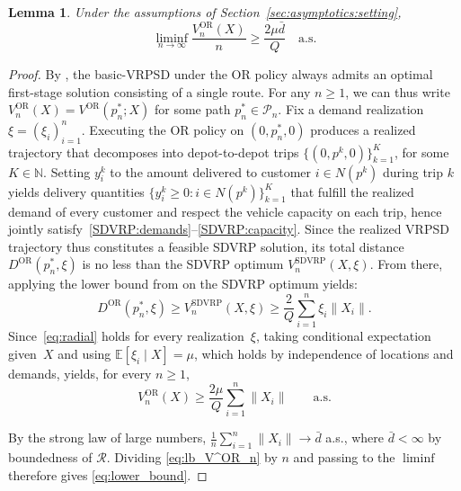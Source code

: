 \documentclass{article}
\newtheorem{lemma}{Lemma}
\begin{document}
{\begin{lemma}\label{lem:asymptotic_lb}
Under the assumptions of Section~\ref{sec:asymptotics:setting},
\begin{equation}\label{eq:lower_bound}
    \liminf_{n \to \infty} \frac{V^{\text{OR}}_n(X)}{n} \geq \frac{2\mu\bar d}{Q} \quad \text{a.s.}
\end{equation}
\end{lemma}
\begin{proof}
By \cite[Theorem~2]{yang2000stochastic}, the basic-VRPSD under the OR policy always admits an optimal first-stage solution consisting of a single route. For any $n\geq 1$, we can thus write $V^{\text{OR}}_n(X) = V^{\text{OR}}(p^*_n; X)$ for some path $p^*_n \in \mathcal{P}_n$. Fix a demand realization $\xi = (\xi_i)_{i=1}^n$. Executing the OR policy on $(0, p^*_n, 0)$ produces a realized trajectory that decomposes into depot-to-depot trips $\{(0, p^k, 0)\}_{k=1}^K$, for some $K \in \mathbb{N}$. Setting $y_i^k$ to the amount delivered to customer $i \in N(p^k)$ during trip $k$ yields delivery quantities $\{y_i^k \geq 0 : i \in N(p^k)\}_{k=1}^K$ that fulfill the realized demand of every customer and respect the vehicle capacity on each trip, hence jointly satisfy~\eqref{SDVRP:demands}--\eqref{SDVRP:capacity}. Since the realized VRPSD trajectory thus constitutes a feasible SDVRP solution, its total distance $D^{\text{OR}}(p^*_n, \xi)$ is no less than the SDVRP optimum $V^{\text{SDVRP}}_n(X, \xi)$. From there, applying the lower bound from \cite[Section 7, Lemma~1]{haimovich1985bounds} on the SDVRP optimum yields:
\begin{equation}\label{eq:radial}
D^{\text{OR}}(p^*_n, \xi) \geq V^{\text{SDVRP}}_n(X, \xi) \geq \frac{2}{Q}\sum_{i=1}^n \xi_i \|X_i\|.
\end{equation}
Since~\eqref{eq:radial} holds for every realization~$\xi$, taking 
conditional expectation given~$X$ and using $\mathbb{E}[\xi_i \mid X] = \mu$, which holds by independence of locations and demands, yields, for every $n \geq 1$,
\begin{equation}\label{eq:lb_V^OR_n}
    V^{\text{OR}}_n(X) \geq \frac{2\mu}{Q}\sum_{i=1}^n \|X_i\|
    \qquad \text{a.s.}
\end{equation}

By the strong law of large numbers, $\frac{1}{n}\sum_{i=1}^n \|X_i\| \to \bar{d}$ a.s., where $\bar{d} < \infty$ by boundedness of $\mathcal{R}$. Dividing \eqref{eq:lb_V^OR_n} by $n$ and passing to the $\liminf$ therefore gives \eqref{eq:lower_bound}.
\end{proof}

}
\end{document}
